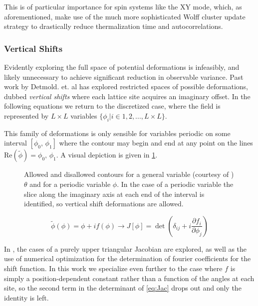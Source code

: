 \documentclass[12pt]{article}
\begin{document}
This is of particular importance for spin systems like the XY mode, which, as aforementioned, make use of the much more sophisticated Wolff 
cluster update strategy to drastically reduce thermalization time and autocorrelations.

\subsubsection{Vertical Shifts}

Evidently exploring the full space of potential deformations is infeasibly, and likely unnecessary to achieve significant reduction in observable
variance. Past work by Detmold. et. al \cite{Detmold_2021} has explored restricted spaces of possible deformations, dubbed \textit{vertical shifts} where 
each lattice site acquires an imaginary offset. In the following equations we return to the discretized case, where the field is represented
by $L\times L$ variables $\{\phi_i | i\in{1,2,...,L\times L}\}$.

This family of deformations is only sensible for variables periodic on some interval $[\phi_0,\,\phi_1]$ where the contour may begin and end at any point on the 
lines $\mathrm{Re}(\tilde{\phi}) = \phi_0,\,\phi_1$. A visual depiction is given in \ref{fig:contours}.

\begin{figure}
	\begin{center}
	
	\end{center}
	\caption[Vertical Shift Illustration]{Allowed and disallowed contours for a general variable (courtesy of \cite{Detmold_2021}) $\theta$ and for a periodic variable $\phi$.
	In the case of a periodic variable the slice along the imaginary axis at each end of the interval is identified, 
	so vertical shift deformations are allowed.}
	\label{fig:contours}
\end{figure}

\begin{equation} \label{eq:Jac}
	\tilde{\phi}(\phi) = \phi + if(\phi) \rightarrow J[\phi] = \det\left(\delta_{ij} + i \frac{\partial f_i}{\partial \phi_j} \right)
\end{equation}

In \cite{Detmold_2021}, the cases of a purely upper triangular Jacobian are explored, as well as the use of numerical optimization for the determination of fourier coefficients
for the shift function. In this work we specialize even further to the case where $f$ is simply a position-dependent constant rather than a function of the angles
at each site, so the second term in the determinant of \ref{eq:Jac} drops out and only the identity is left. 
\end{document}
